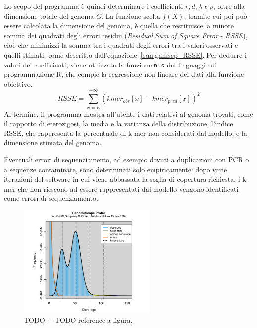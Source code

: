 \documentclass[crop=false, class=book]{standalone}
\begin{document}
	Lo scopo del programma è quindi determinare i coefficienti $r, d, \lambda$ e $\rho$, oltre alla dimensione totale del genoma $G$. La funzione scelta $f(X)$, tramite cui poi può essere calcolata la dimensione del genoma, è quella che restituisce la minore somma dei quadrati degli errori residui (\textit{Residual Sum of Square Error} - \textit{RSSE}), cioè che minimizzi la somma tra i quadrati degli errori tra i valori osservati e quelli stimati, come descritto dall'equazione~\vref{eqn:gnmscp_RSSE}. Per dedurre i valori dei coefficienti, viene utilizzata la funzione \verb|nls| del linguaggio di programmazione R, che compie la regressione non lineare dei dati alla funzione obiettivo.
	\begin{equation}
		RSSE = \sum_{x=E}^{+\infty} \left(kmer_{obs}[x] - kmer_{pred}[x]\right)^2
	\label{eqn:gnmscp_RSSE}
	\end{equation}
	Al termine, il programma mostra all'utente i dati relativi al genoma trovati, come il rapporto di eterozigosi, la media e la varianza della distribuzione, l'indice RSSE, che rappresenta la percentuale di k-mer non considerati dal modello, e la dimensione stimata del genoma.
	
	Eventuali errori di sequenziamento, ad esempio dovuti a duplicazioni con PCR o a sequenze contaminate, sono determinati solo empiricamente: dopo varie iterazioni del software in cui viene abbassata la soglia di copertura richiesta, i k-mer che non riescono ad essere rappresentati dal modello vengono identificati come errori di sequenziamento.
	
	\begin{figure}
		\centering
		\includegraphics[width=0.6\textwidth]{capitoli/genomescope/gnmscp_genomescopeprofile.png}
		\caption{TODO + TODO reference a figura.}
		\label{fig:gnmscp_genomescopeprofile}
	\end{figure}

	
	
	
	
\end{document}
